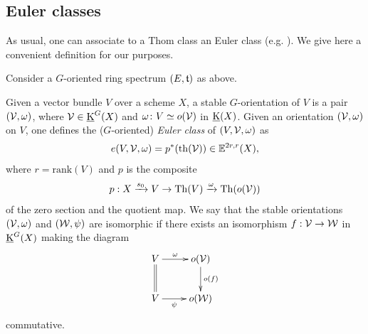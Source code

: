 %

\subsection{Euler classes}

As usual, one can associate to a Thom class an Euler class (e.g. \cite[Def. 2.1.7]{DF3}). We give here a convenient definition for our purposes.

\begin{df}\label{df:Euler_class}
Consider a $G$-oriented ring spectrum $(E,\mathfrak{t})$ as above.

Given a vector bundle $V$ over a scheme $X$,
 a stable $G$-orientation of $V$ is a pair $(\mathcal V,\omega)$, where $\mathcal V \in \operatorname{\underline K}^G(X)$
 and $\omega\colon V\simeq o(\mathcal V)$ in $\operatorname{\underline K}(X)$.
Given an orientation $(\mathcal V,\omega)$ on $V$,
 one defines the ($G$-oriented) \emph{Euler class} of $(V,\mathcal V,\omega)$ as
$$
e(V,\mathcal V,\omega)=p^*(\operatorname{th}(\mathcal V)) \in  \mathbb E^{2r,r}(X),
$$ 
where $r=\mathrm{rank}(V)$ and $p$ is the composite
\[
p:X \xrightarrow{s_0} V \rightarrow \operatorname{Th}(V)\xrightarrow{\omega}\operatorname{Th}(o(\mathcal V))
\]
of the zero section and the quotient map. We say that the stable orientations $(\mathcal V,\omega)$ and $(\mathcal W,\psi)$ are isomorphic if there exists an isomorphism $f:\mathcal V\to \mathcal W$ in $\operatorname{\underline K}^G(X)$ making the diagram
\[
\xymatrix{V\ar[r]^-{\omega}\ar@{=}[d] & o(\cV)\ar[d]^-{o(f)} \\
V\ar[r]_-{\psi} & o(\cW)}
\]
commutative.
\end{df}

